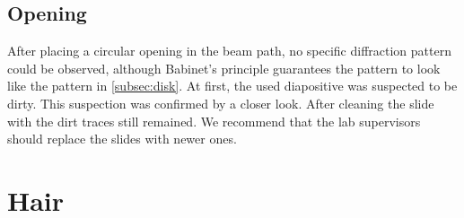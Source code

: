 \subsection*{Opening}
After placing a circular opening in the beam path, no specific diffraction pattern could be observed, although Babinet's principle guarantees the pattern to look like the pattern in \autoref{subsec:disk}.
At first, the used diapositive was suspected to be dirty.
This suspection was confirmed by a closer look.
After cleaning the slide with  the dirt traces still remained.
We recommend that the lab supervisors should replace the slides with newer ones.

\section{Hair}
